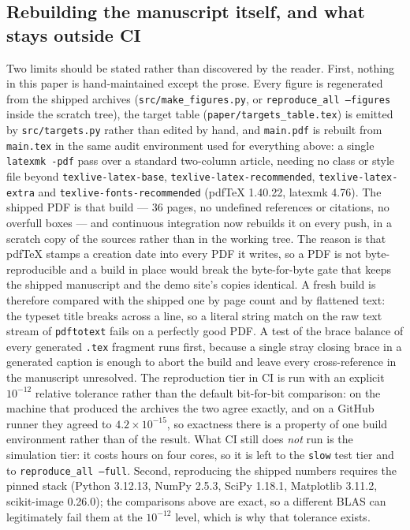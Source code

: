 \documentclass[twocolumn,10pt]{article}
\begin{document}
\subsection{Rebuilding the manuscript itself, and what stays outside CI}
Two limits should be stated rather than discovered by the reader. First, nothing
in this paper is hand-maintained except the prose. Every figure is regenerated
from the shipped archives ({\tt src/make\_figures.py}, or {\tt reproduce\_all
--figures} inside the scratch tree), the target table
({\tt paper/targets\_table.tex}) is emitted by {\tt src/targets.py} rather than
edited by hand, and {\tt main.pdf} is rebuilt from {\tt main.tex} in the same
audit environment used for everything above: a single {\tt latexmk -pdf} pass
over a standard two-column article, needing no class or style file beyond
{\tt texlive-latex-base}, {\tt texlive-latex-recommended},
{\tt texlive-latex-extra} and {\tt texlive-fonts-recommended} (pdfTeX 1.40.22,
latexmk 4.76). The shipped PDF is that build --- 36 pages, no undefined
references or citations, no overfull boxes --- and continuous integration now
rebuilds it on every push, in a scratch copy of the sources rather than in the
working tree. The reason is that pdfTeX stamps a creation date into every PDF it
writes, so a PDF is not byte-reproducible and a build in place would break the
byte-for-byte gate that keeps the shipped manuscript and the demo site's copies
identical. A fresh build is therefore compared with the shipped one by page
count and by flattened text: the typeset title breaks across a line, so a
literal string match on the raw text stream of {\tt pdftotext} fails on a
perfectly good PDF. A test of the brace balance of every generated {\tt .tex}
fragment runs first, because a single stray closing brace in a
generated caption is enough to abort the build and leave every cross-reference
in the manuscript unresolved. The reproduction tier in CI is run with an explicit
$10^{-12}$ relative tolerance rather than the default bit-for-bit comparison: on
the machine that produced the archives the two agree exactly, and on a GitHub
runner they agreed to $4.2\times10^{-15}$, so exactness there is a property of
one build environment rather than of the result. What CI still does
\emph{not} run is the simulation tier: it costs hours on four cores, so it is
left to the {\tt slow} test tier and to {\tt reproduce\_all --full}.
Second, reproducing the shipped numbers requires the pinned stack
(Python 3.12.13, NumPy 2.5.3, SciPy 1.18.1, Matplotlib 3.11.2, scikit-image
0.26.0); the comparisons above are exact, so a different BLAS can legitimately
fail them at the $10^{-12}$ level, which is why that tolerance exists.
\end{document}
